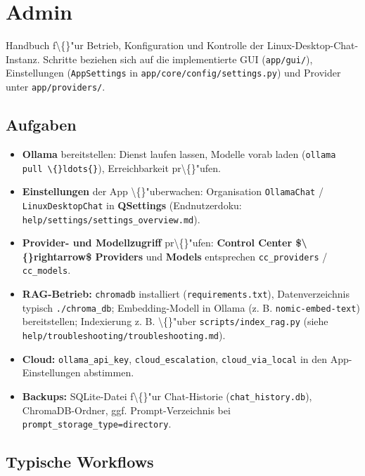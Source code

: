 \section{Admin}

Handbuch f\textbackslash\{\}"ur Betrieb, Konfiguration und Kontrolle der Linux-Desktop-Chat-Instanz. Schritte beziehen sich auf die implementierte GUI (\texttt{app/gui/}), Einstellungen (\texttt{AppSettings} in \texttt{app/core/config/settings.py}) und Provider unter \texttt{app/providers/}.

\subsection{Aufgaben}

\begin{itemize}
\item \textbf{Ollama} bereitstellen: Dienst laufen lassen, Modelle vorab laden (\texttt{ollama pull \textbackslash\{\}ldots\{\}}), Erreichbarkeit pr\textbackslash\{\}"ufen.
\item \textbf{Einstellungen} der App \textbackslash\{\}"uberwachen: Organisation \texttt{OllamaChat} / \texttt{LinuxDesktopChat} in \textbf{QSettings} (Endnutzerdoku: \texttt{help/settings/settings\_overview.md}).
\item \textbf{Provider- und Modellzugriff} pr\textbackslash\{\}"ufen: \textbf{Control Center \$\textbackslash\{\}rightarrow\$ Providers} und \textbf{Models} entsprechen \texttt{cc\_providers} / \texttt{cc\_models}.
\item \textbf{RAG-Betrieb:} \texttt{chromadb} installiert (\texttt{requirements.txt}), Datenverzeichnis typisch \texttt{./chroma\_db}; Embedding-Modell in Ollama (z. B. \texttt{nomic-embed-text}) bereitstellen; Indexierung z. B. \textbackslash\{\}"uber \texttt{scripts/index\_rag.py} (siehe \texttt{help/troubleshooting/troubleshooting.md}).
\item \textbf{Cloud:} \texttt{ollama\_api\_key}, \texttt{cloud\_escalation}, \texttt{cloud\_via\_local} in den App-Einstellungen abstimmen.
\item \textbf{Backups:} SQLite-Datei f\textbackslash\{\}"ur Chat-Historie (\texttt{chat\_history.db}), ChromaDB-Ordner, ggf. Prompt-Verzeichnis bei \texttt{prompt\_storage\_type=directory}.
\end{itemize}

\subsection{Typische Workflows}

